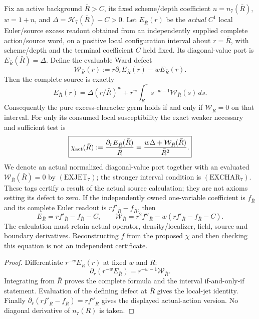 \documentclass[12pt,a4paper]{article}
\begin{document}
\begin{theorem}
\label{p3d:thm:v2211-excess-character-certificate}
Fix an active background $\bar R>C$, its fixed scheme/depth coefficient
$n=n_7(\bar R)$, $w=1+n$, and
$\Delta=\mathscr H_7(\bar R)-C>0$. Let $E_{\bar R}(r)$ be the
\emph{actual} $C^1$ local Euler/source excess readout obtained from an
independently supplied complete action/source word, on a positive local
configuration interval about $r=\bar R$, with scheme/depth and the
terminal coefficient $C$ held fixed. Its diagonal-value port is
$E_{\bar R}(\bar R)=\Delta$. Define the evaluable Ward defect
\begin{equation}
\label{p3d:eq:v2211-excess-ward-residual}
 \boxed{\mathcal W_{\bar R}(r)
 :=r\partial_rE_{\bar R}(r)-wE_{\bar R}(r).}
\end{equation}
Then the complete source is exactly
\begin{equation}
\label{p3d:eq:v2211-excess-ward-reconstruction}
 \boxed{E_{\bar R}(r)=
 \Delta(r/\bar R)^w+
 r^w\int_{\bar R}^{r}s^{-w-1}\mathcal W_{\bar R}(s)\,ds.}
\end{equation}
Consequently the pure excess-character germ holds if and only if
$\mathcal W_{\bar R}=0$ on that interval. For only its consumed local
susceptibility the exact weaker necessary and sufficient test is
\begin{equation}
\label{p3d:eq:v2211-excess-local-jet-certificate}
 \boxed{\chi_{\rm act}(\bar R)
 :=\frac{\partial_rE_{\bar R}(\bar R)}{\bar R}
 =\frac{w\Delta+\mathcal W_{\bar R}(\bar R)}{\bar R^2}.}
\end{equation}
We denote an actual normalized diagonal-value port together with an evaluated
$\mathcal W_{\bar R}(\bar R)=0$ by $(\mathrm{EXJET}_7)$; the stronger
interval condition is $(\mathrm{EXCHAR}_7)$. These tags certify a result
of the actual source calculation; they are not axioms setting its defect to
zero. If the independently owned one-variable coefficient is $f_{\bar R}$
and its complete Euler readout is $r f'_{\bar R}-f_{\bar R}$, then
\[
 E_{\bar R}=r f'_{\bar R}-f_{\bar R}-C,\qquad
 \mathcal W_{\bar R}=r^2f''_{\bar R}
 -w(rf'_{\bar R}-f_{\bar R}-C).
\]
The calculation must retain actual operator, density/localizer, field, source
and boundary derivatives. Reconstructing $f$ from the proposed $\chi$ and
then checking this equation is not an independent certificate.
\end{theorem}
\begin{proof}
Differentiate $r^{-w}E_{\bar R}(r)$ at fixed $w$ and $\bar R$:
\[
 \partial_r(r^{-w}E_{\bar R})
 =r^{-w-1}\mathcal W_{\bar R}.
\]
Integrating from $\bar R$ proves the complete formula and the interval
if-and-only-if statement. Evaluation of the defining defect at $\bar R$
gives the local-jet identity. Finally
$\partial_r(rf'_{\bar R}-f_{\bar R})=rf''_{\bar R}$ gives the displayed
actual-action version. No diagonal derivative of $n_7(R)$ is taken.
\end{proof}
\end{document}
